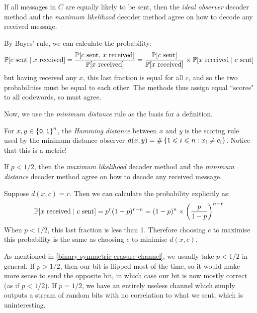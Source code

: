 \documentclass{article}
\begin{document}
\begin{proposition}
	\label{decoder-agreement-ideal-observer-max-likelihood}
    If all messages in $C$ are equally likely to be sent,
    then the \textit{ideal observer} decoder method
    and the \textit{maximum likelihood} decoder method
    agree on how to decode any received message.
\end{proposition}

\begin{prf}
    By Bayes' rule, we can calculate the probability:
    \[
	\P[c \text{ sent} \mid x \text{ received}]
	=
	\frac
	{\P[c \text{ sent}, \, x \text{ received}]}
	{\P[x \text{ received}]}
	=
	\frac
	{\P[c \text{ sent}]}
	{\P[x \text{ received}]}
	\times \P[x \text{ received} \mid c \text{ sent}]
	\]
	but having received any $x$,
	this last fraction is equal for all $c$,
	and so the two probabilities must be equal to each other.
	The methods thus assign equal ``scores" to all codewords,
	so must agree.
\end{prf}

Now, we use the \textit{minimum distance} rule as the basis for a definition.

\begin{definition}
	\label{hamming-distance}
    For $x, y \in \binset^n$,
    the \textit{Hamming distance} between $x$ and $y$
    is the scoring rule used by the minimum distance observer
    $d(x, y) = \#\set{1 \leq i \leq n : x_i \neq c_i}$.
    Notice that this is a metric!
\end{definition}

\begin{proposition}
	\label{decoder-agreement-max-likelihood-min-distance}
    If $p < 1/2$,
    then the \textit{maximum likelihood} decoder method
    and the \textit{minimum distance} decoder method
    agree on how to decode any received message.
\end{proposition}

\begin{prf}
	Suppose $d(x, c) = r$.
	Then we can calculate the probability explicitly as:
	\[
	\P[x \text{ received} \mid c \text{ sent}] =
	p^r(1-p)^{r-n} = (1-p)^n
	\times \left( \frac{p}{1-p} \right)^{n-r}
	\]
	When $p < 1/2$,
	this last fraction is less than 1.
	Therefore choosing $c$ to maximise this probability
	is the same as choosing $c$ to minimise $d(x, c)$.
\end{prf}

\begin{note}
	As mentioned in \ref{binary-symmetric-erasure-channel},
	we usually take $p < 1/2$ in general.
	If $p > 1/2$, then our bit is flipped most of the time,
	so it would make more sense to send the opposite bit,
	in which case our bit is now mostly correct (as if $p < 1/2$).
	If $p = 1/2$, we have an entirely useless channel
	which simply outputs a stream of random bits
	with no correlation to what we sent,
	which is uninteresting.
\end{note}
\end{document}
